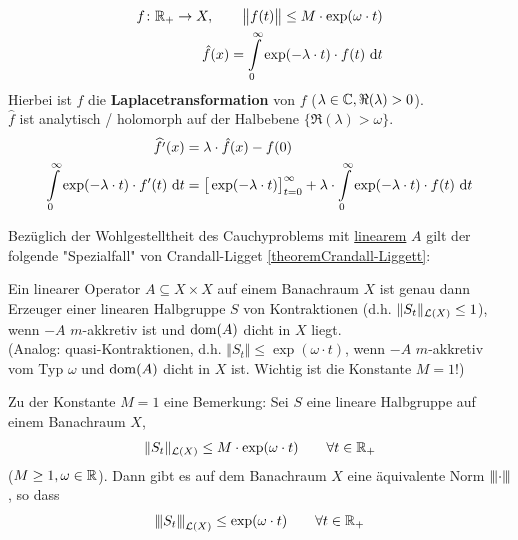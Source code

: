 \begin{align*}
f\colon\mathbb{R}_+\to X,\qquad\big\Vert f(t)\big\Vert\leq M\cdot\exp(\omega\cdot t)\\
\hat{f}(x)=\int\limits_0^\infty\exp(-\lambda\cdot t)\cdot f(t)\text{ d} t
\end{align*}
Hierbei ist $\hat{f}$ die \textbf{Laplacetransformation} von $f$ ($\lambda\in\mathbb{C},\Re(\lambda)>0$).\\
$\hat{f}$ ist analytisch / holomorph auf der Halbebene $\big\lbrace\Re(\lambda)>\omega\big\rbrace$. 
\begin{align*}
\widehat{f'}(x)&=\lambda\cdot\hat{f}(x)-f(0)\\
\int\limits_0^\infty\exp(-\lambda\cdot t)\cdot f'(t)\text{ d} t
&=\big[\exp(-\lambda\cdot t)\big]_{t=0}^\infty+\lambda\cdot\int\limits_0^\infty\exp(-\lambda\cdot t)\cdot f(t)\text{ d} t
\end{align*}

Bezüglich der Wohlgestelltheit des Cauchyproblems mit \ul{linearem} $A$ gilt der folgende "Spezialfall" von Crandall-Ligget \ref{theoremCrandall-Liggett}:

\begin{theorem}\enter
Ein linearer Operator $A\subseteq X\times X$ auf einem Banachraum $X$ ist genau dann Erzeuger einer linearen Halbgruppe $S$ von Kontraktionen (d.h. $\Vert S_t\Vert_{\mathcal{L}(X)}\leq 1$), wenn $-A$ $m$-akkretiv ist und $\operatorname{dom}(A)$ dicht in $X$ liegt.\\
(Analog: quasi-Kontraktionen, d.h. $\Vert S_t\Vert\leq\exp(\omega\cdot t)$, wenn $-A$ $m$-akkretiv vom Typ $\omega$ und $\operatorname{dom}(A)$ dicht in $X$ ist. Wichtig ist die Konstante $M=1$!)
\end{theorem}

\begin{bemerkung}
Zu der Konstante $M=1$ eine Bemerkung: Sei $S$ eine lineare Halbgruppe auf einem Banachraum $X$,
\begin{align*}
\Vert S_t\Vert_{\mathcal{L}(X)}\leq M\cdot\exp(\omega\cdot t)\qquad\forall t\in\mathbb{R}_+
\end{align*}
($M\geq1,\omega\in\mathbb{R}$). Dann gibt es auf dem Banachraum $X$ eine äquivalente Norm ${\left\vert\kern-0.25ex\left\vert\kern-0.25ex\left\vert \cdot \right\vert\kern-0.25ex\right\vert\kern-0.25ex\right\vert}$, so dass
\begin{align*}
{\left\vert\kern-0.25ex\left\vert\kern-0.25ex\left\vert S_t \right\vert\kern-0.25ex\right\vert\kern-0.25ex\right\vert}_{\mathcal{L}(X)}\leq\exp(\omega\cdot t)\qquad\forall t\in\mathbb{R}_+
\end{align*} 
\end{bemerkung}


